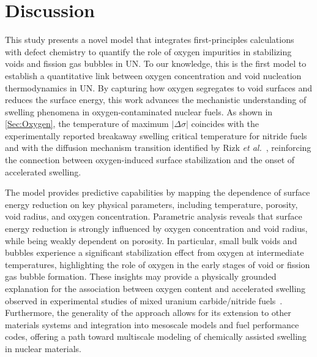 \documentclass[preprint,12pt,sort&compress]{elsarticle}
\newcommand{\?}{\stackrel{?}{=}}
\begin{document}
\section{Discussion}
\label{Sec:Discuss}

This study presents a novel model that integrates first-principles calculations with defect chemistry to quantify the role of oxygen impurities in stabilizing voids and fission gas bubbles in UN. To our knowledge, this is the first model to establish a quantitative link between oxygen concentration and void nucleation thermodynamics in UN. By capturing how oxygen segregates to void surfaces and reduces the surface energy, this work advances the mechanistic understanding of swelling phenomena in oxygen-contaminated nuclear fuels. As shown in \cref{Sec:Oxygen}, the temperature of maximum $|\Delta \sigma|$ coincides with the experimentally reported breakaway swelling critical temperature for nitride fuels~\cite{Ronchi1978} and with the diffusion mechanism transition identified by Rizk \textit{et al.}~\cite{Rizk2025}, reinforcing the connection between oxygen-induced surface stabilization and the onset of accelerated swelling.


The model provides predictive capabilities by mapping the dependence of surface energy reduction on key physical parameters, including temperature, porosity, void radius, and oxygen concentration. Parametric analysis reveals that surface energy reduction is strongly influenced by oxygen concentration and void radius, while being weakly dependent on porosity. In particular, small bulk voids and bubbles experience a significant stabilization effect from oxygen at intermediate temperatures, highlighting the role of oxygen in the early stages of void or fission gas bubble formation. These insights may provide a physically grounded explanation for the association between oxygen content and accelerated swelling observed in experimental studies of mixed uranium carbide/nitride fuels~\cite{Rogozkin2003}. Furthermore, the generality of the approach allows for its extension to other materials systems and integration into mesoscale models and fuel performance codes, offering a path toward multiscale modeling of chemically assisted swelling in nuclear materials.
\end{document}
